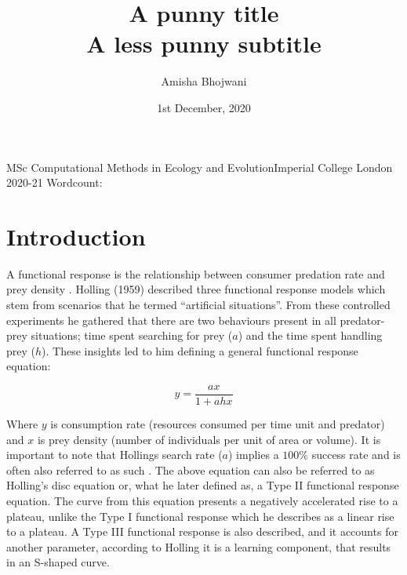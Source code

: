 \documentclass[11pt]{article}
\date{1st December, 2020}
\title{A punny title \\ \large A less punny subtitle \\}
\author{Amisha Bhojwani}
\newcommand\wordcount{}
\begin{document}
  
  \begin{titlepage}
    \centering
    \maketitle
    MSc Computational Methods in Ecology and Evolution\newline Imperial College London 2020-21\newline
    Wordcount: \wordcount{}
  \end{titlepage}
  
  \tableofcontents{}
  \pagebreak
  \abstract
  
  \section{Introduction}
  
  A functional response is the relationship between consumer predation rate and prey density \cite{Solomon1949}. Holling (1959) \cite{Holling1959} described three functional response models which stem from scenarios that he termed “artificial situations”. From these controlled experiments he gathered that there are two behaviours present in all predator-prey situations; time spent searching for prey ($a$) and the time spent handling prey ($h$). These insights led to him defining a general functional response equation:
  
  \begin{linenomath*}
    \begin{equation}
      y=\frac{ax}{1+ahx}\label{eq:1}
    \end{equation}
  \end{linenomath*}
  
  Where $y$ is consumption rate (resources consumed per time unit and predator) and $x$ is prey density (number of individuals per unit of area or volume). It is important to note that Hollings search rate ($a$) implies a $100\%$ success rate  and is often also referred to as such \cite{Holling1959}. The above equation can also be referred to as Holling’s disc equation or, what he later defined as, a Type II functional response equation. The curve from this equation presents a negatively accelerated rise to a plateau, unlike the Type I functional response which he describes as a linear rise to a plateau. A Type III functional response is also described, and it accounts for another parameter, according to Holling it is a learning component, that results in an S-shaped curve. 
  
\end{document}
